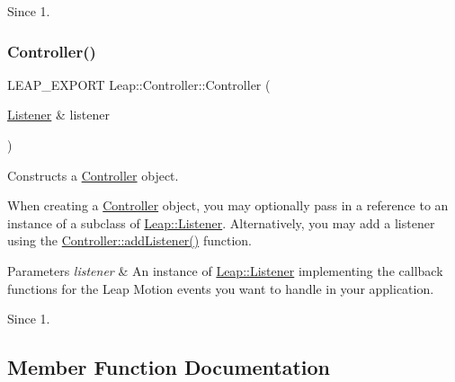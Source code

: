 \begin{DoxySince}{Since}
1. 
\end{DoxySince}
\mbox{\label{class_leap_1_1_controller_a046b09a621c480a46b3783551191abbb}} 
\subsubsection{\texorpdfstring{Controller()}{Controller()}\hspace{0.1cm}{\footnotesize\ttfamily [2/2]}}
{\footnotesize\ttfamily L\+E\+A\+P\+\_\+\+E\+X\+P\+O\+RT Leap\+::\+Controller\+::\+Controller (\begin{DoxyParamCaption}\item[{\hyperlink{class_leap_1_1_listener}{Listener} \&}]{listener }\end{DoxyParamCaption})}

Constructs a \hyperlink{class_leap_1_1_controller}{Controller} object.

When creating a \hyperlink{class_leap_1_1_controller}{Controller} object, you may optionally pass in a reference to an instance of a subclass of \hyperlink{class_leap_1_1_listener}{Leap\+::\+Listener}. Alternatively, you may add a listener using the \hyperlink{class_leap_1_1_controller_a9b6318221593be63a0385748ca66974f}{Controller\+::add\+Listener()} function.


\begin{DoxyCodeInclude}
\end{DoxyCodeInclude}



\begin{DoxyParams}{Parameters}
{\em listener} & An instance of \hyperlink{class_leap_1_1_listener}{Leap\+::\+Listener} implementing the callback functions for the Leap Motion events you want to handle in your application. \\
\hline
\end{DoxyParams}
\begin{DoxySince}{Since}
1. 
\end{DoxySince}


\subsection{Member Function Documentation}
\mbox{\label{class_leap_1_1_controller_a9b6318221593be63a0385748ca66974f}} 
